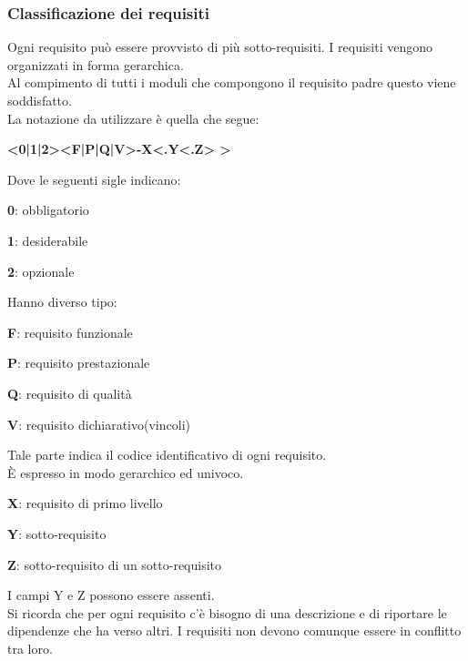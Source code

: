 \documentclass[12pt,a4paper,titlepage]{article}
\begin{document}
\subsubsection{Classificazione dei requisiti}
Ogni requisito può essere provvisto di più sotto-requisiti. I requisiti vengono organizzati in forma gerarchica.\\
Al compimento di tutti i moduli che compongono il requisito padre questo viene soddisfatto.\\
La notazione da utilizzare è quella che segue:
\begin{center}
\textbf{ <0|1|2><F|P|Q|V>-X<.Y<.Z> > }
\end{center}
Dove le seguenti sigle indicano:
\begin{trivlist}
	\item \textbf{0}: obbligatorio
	\item \textbf{1}: desiderabile
	\item \textbf{2}: opzionale
\end{trivlist} 
Hanno diverso tipo:
\begin{trivlist}
	\item \textbf{F}: requisito funzionale
	\item \textbf{P}: requisito prestazionale
	\item \textbf{Q}: requisito di qualità
	\item \textbf{V}: requisito dichiarativo(vincoli)
\end{trivlist} 
Tale parte indica il codice identificativo di ogni requisito.\\
È espresso in modo gerarchico ed univoco.
\begin{trivlist}
	\item \textbf{X}: requisito di primo livello
	\item \textbf{Y}: sotto-requisito
	\item \textbf{Z}: sotto-requisito di un sotto-requisito
\end{trivlist} 
I campi Y e Z possono essere assenti.\\
Si ricorda che per ogni requisito c'è bisogno di una descrizione e di riportare le dipendenze che ha verso altri. I requisiti non devono comunque essere in conflitto tra loro.
\end{document}

